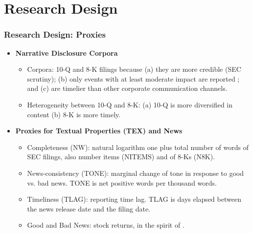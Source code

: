 \documentclass{beamer}
\begin{document}
\section{Research Design}
\begin{frame}
\frametitle{Research Design: Proxies}
\begin{itemize}

\item \textbf{Narrative Disclosure Corpora}

	\begin{itemize}
		\item Corpora: 10-Q and 8-K filings because (a) they are more credible (SEC scrutiny); (b) only events with at least moderate impact are reported \citep{hassanFirmLevelPoliticalRisk2019}; and (c) are timelier than other corporate communication channels.
		\item Heterogeneity between 10-Q and 8-K: (a) 10-Q is more diversified in content (b) 8-K is more timely.
	\end{itemize}

\medskip
\pause

\item \textbf{Proxies for Textual Properties (TEX) and News}
	\begin{itemize}
		\item Completeness (NW): natural logarithm one plus total number of words of SEC filings, also number items (NITEMS) and of 8-Ks (N8K). \pause
		\item News-consistency (TONE): marginal change of tone in response to  good vs. bad news. TONE is net positive words per thousand words. \pause
		\item Timeliness (TLAG): reporting time lag. TLAG is days elapsed between the news release date and the filing date. \pause
		\item Good and Bad News: stock returns, in the spirit of \cite{basuConservatismPrincipleAsymmetric1997}.
	\end{itemize}

\end{itemize}
\end{frame}
\end{document}
